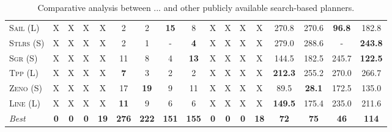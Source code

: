 \documentclass[11pt]{article}
\begin{document}
\begin{table}[tb]
{\begin{tabular}{|l||cccccccc||cccccccc||}
\textsc{Sail} (L)&X&X&X&X&2&2&\textbf{15}&8&X&X&X&X&270.8&270.6&\textbf{96.8}&182.8\\
\textsc{Stlrs} (S)&X&X&X&X&2&1&-&\textbf{4}&X&X&X&X&279.0&288.6&-&\textbf{243.8}\\
\textsc{Sgr} (S)&X&X&X&X&11&8&4&\textbf{13}&X&X&X&X&144.5&182.5&245.7&\textbf{122.5}\\
\textsc{Tpp} (L)&X&X&X&X&\textbf{7}&3&2&2&X&X&X&X&\textbf{212.3}&255.2&270.0&266.7\\
\textsc{Zeno} (S)&X&X&X&X&17&\textbf{19}&9&11&X&X&X&X&89.5&\textbf{28.1}&172.5&135.0\\
\textsc{Line} (L)&X&X&X&X&\textbf{11}&9&6&6&X&X&X&X&\textbf{149.5}&175.4&235.0&211.6
\\\hline
\textit{Best}&\textbf{0}&\textbf{0}&\textbf{0}&\textbf{19}&\textbf{276}&\textbf{222}&\textbf{151}&\textbf{155}&\textbf{0}&\textbf{0}&\textbf{0}&\textbf{18}&\textbf{72}&\textbf{75}&\textbf{46}&\textbf{114}\\\hline

        \end{tabular}}
        \caption{Comparative analysis between ... and other publicly available search-based planners.}
        \label{tab:search}
        \end{table}
        
\end{document}
